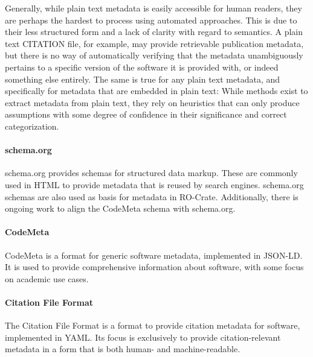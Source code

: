 \documentclass{article}
\begin{document}
Generally, while plain text metadata is easily accessible for human readers, they are perhaps the hardest to process using automated approaches. This is due to their less structured form and a lack of clarity with regard to semantics. A plain text CITATION file, for example, may provide retrievable publication metadata, but there is no way of automatically verifying that the metadata unambiguously pertains to a specific version of the software it is provided with, or indeed something else entirely. The same is true for any plain text metadata, and specifically for metadata that are embedded in plain text: While methods exist to extract metadata from plain text, they rely on heuristics that can only produce assumptions with some degree of confidence in their significance and correct categorization.



\paragraph{schema.org}\label{par:metadata-formats-schema-org}
schema.org\cite{138880/PI4Z5AFK} provides schemas for structured data markup. These are commonly used in HTML to provide metadata that is reused by search engines. schema.org schemas are also used as basis for metadata in RO-Crate\cite{138880/S5F3HZ96}. Additionally, there is ongoing work to align the CodeMeta schema\cite{138880/NBDB4VHJ} with schema.org.



\paragraph{CodeMeta}\label{par:metadata-formats-codemeta}
CodeMeta \cite{138880/NBDB4VHJ} is a format for generic software metadata, implemented in JSON-LD. It is used to provide comprehensive information about software, with some focus on academic use cases.



\paragraph{Citation File Format}\label{par:metadata-formats-cff}
The Citation File Format \cite{138880/M4MT8YLA} is a format to provide citation metadata for software, implemented in YAML. Its focus is exclusively to provide citation-relevant metadata in a form that is both human- and machine-readable.
\end{document}
